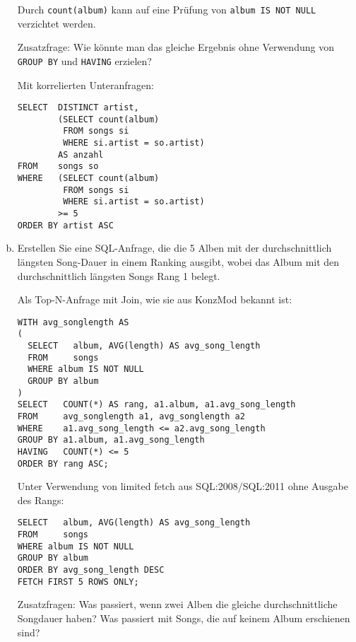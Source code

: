 \begin{enumerate}[a)]
\begin{solution}
	\begin{note}
	Durch \texttt{count(album)} kann auf eine Prüfung von \texttt{album IS NOT NULL} verzichtet werden.
	\end{note}

	Zusatzfrage: Wie könnte man das gleiche Ergebnis ohne Verwendung von \texttt{GROUP BY} und \texttt{HAVING} erzielen?
	\end{solution}

\cprotEnv
	\begin{note}
	Mit korrelierten Unteranfragen:
	\begin{lstlisting}
SELECT  DISTINCT artist,
        (SELECT count(album)
         FROM songs si
         WHERE si.artist = so.artist)
        AS anzahl
FROM    songs so
WHERE   (SELECT count(album)
         FROM songs si
         WHERE si.artist = so.artist)
        >= 5
ORDER BY artist ASC
    \end{lstlisting}

	\end{note}


	\item Erstellen Sie eine SQL-Anfrage, die die 5 Alben mit der durchschnittlich längsten Song-Dauer in einem Ranking ausgibt, wobei das Album mit den durchschnittlich längsten Songs Rang 1 belegt.

\cprotEnv
	\begin{solution}

	Als Top-N-Anfrage mit Join, wie sie aus KonzMod bekannt ist:
	\begin{lstlisting}
WITH avg_songlength AS
(
  SELECT   album, AVG(length) AS avg_song_length
  FROM     songs
  WHERE album IS NOT NULL
  GROUP BY album
)
SELECT   COUNT(*) AS rang, a1.album, a1.avg_song_length
FROM     avg_songlength a1, avg_songlength a2
WHERE    a1.avg_song_length <= a2.avg_song_length
GROUP BY a1.album, a1.avg_song_length
HAVING   COUNT(*) <= 5
ORDER BY rang ASC;
	\end{lstlisting}

	Unter Verwendung von limited fetch aus SQL:2008/SQL:2011 ohne Ausgabe des Rangs:

	\begin{lstlisting}
SELECT   album, AVG(length) AS avg_song_length
FROM     songs
WHERE album IS NOT NULL
GROUP BY album
ORDER BY avg_song_length DESC
FETCH FIRST 5 ROWS ONLY;
	\end{lstlisting}

	Zusatzfragen: Was passiert, wenn zwei Alben die gleiche durchschnittliche Songdauer haben? Was passiert mit Songs, die auf keinem Album erschienen sind?
	\end{solution}


\end{enumerate}
